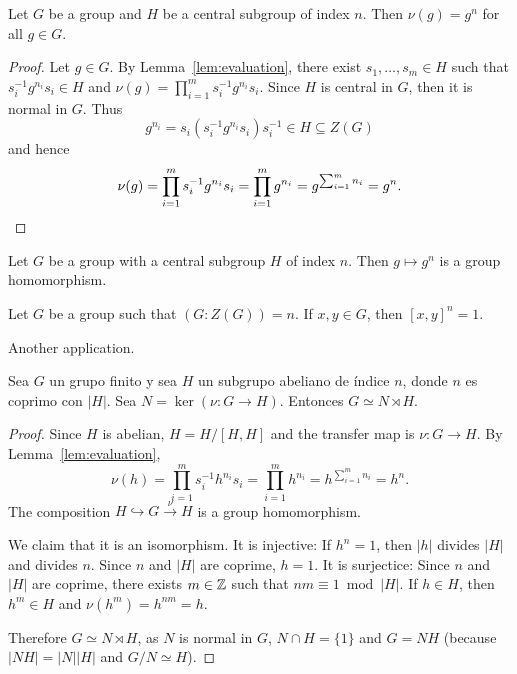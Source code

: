 \begin{proposition}
	\label{prop:v(g)=g^n}
	Let $G$ be a group and $H$ be a central subgroup of index $n$. Then 
	$\nu(g)=g^n$ for all $g\in G$.
\end{proposition}

\begin{proof}
	Let $g\in G$. By Lemma~\ref{lem:evaluation}, there exist $s_1,\dots,s_m\in
	H$ such that $s_i^{-1}g^{n_i}s_i\in H$ and $\nu(g)=\prod_{i=1}^m
	s_i^{-1}g^{n_i}s_i$.  Since $H$ is central in $G$, then it is normal in $G$. Thus 
	\[
	g^{n_i}=s_i(s_i^{-1}g^{n_i}s_i)s_i^{-1}\in H\subseteq Z(G)
	\]
	and hence  
	\[
		\nu(g)
		=\prod_{i=1}^m s_i^{-1}g^{n_i}s_i
		=\prod_{i=1}^m g^{n_i}
		=g^{\sum_{i=1}^m n_i}
		=g^n.\qedhere
	\]
\end{proof}

\begin{exercise}
	Let $G$ be a group with a central subgroup $H$ of index $n$. Then 
	$g\mapsto g^n$ is a group homomorphism. 
\end{exercise}

\begin{exercise}
	\label{corollary:[x,y]^n=1}
	Let $G$ be a group such that $(G:Z(G))=n$. If $x,y\in G$, then $[x,y]^n=1$. 
\end{exercise}

Another application. 

\begin{proposition}
	\label{prop:semidirecto}
	Sea $G$ un grupo finito y sea $H$ un subgrupo abeliano de
	índice $n$, donde $n$ es coprimo con $|H|$.  Sea
	$N=\ker(\nu\colon G\to H)$. Entonces $G\simeq N\rtimes H$.
\end{proposition}

\begin{proof}
	Since $H$ is abelian, $H=H/[H,H]$ and the transfer map is 
	$\nu\colon G\to H$. By Lemma~\ref{lem:evaluation}, 
	\[
		\nu(h)
		=\prod_{i=1}^m s_i^{-1}h^{n_i}s_i
		=\prod_{i=1}^m h^{n_i}
		=h^{\sum_{i=1}^m n_i}=h^n.
	\]
	The composition $H\hookrightarrow G\xrightarrow{\nu} H$ is a group homomorphism. 
	
	We claim that it is an isomorphism. It is injective: If $h^n=1$, then 
	$|h|$ divides $|H|$ and divides $n$. Since $n$ and $|H|$ are
	coprime, $h=1$. It is surjectice: Since $n$ and $|H|$ are coprime, there exists 
	$m\in\mathbb{Z}$ such that $nm\equiv 1\bmod |H|$. If $h\in H$, then $h^m\in
	H$ and $\nu(h^m)=h^{nm}=h$. 

	Therefore $G\simeq N\rtimes H$, as $N$ is normal in $G$, $N\cap
	H=\{1\}$ and $G=NH$ (because $|NH|=|N||H|$ and $G/N\simeq H$).
\end{proof}

